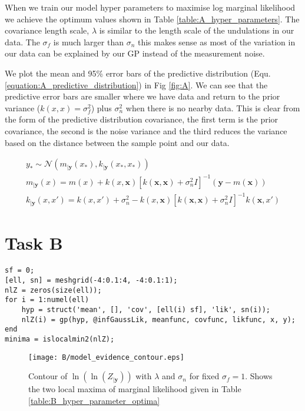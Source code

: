 \documentclass[11pt]{article}
\begin{document}
When we train our model hyper parameters to maximise log marginal likelihood we achieve the optimum values shown in Table \ref{table:A_hyper_parameters}. The covariance length scale, $\lambda$ is similar to the length scale of the undulations in our data. The $\sigma_f$ is much larger than $\sigma_n$ this makes sense as most of the variation in our data can be explained by our GP instead of the measurement noise.

We plot the mean and 95\% error bars of the predictive distribution (Equ.\ref{equation:A_predictive_distribution}) in Fig \ref{fig:A}. We can see that the predictive error bars are smaller where we have data and return to the prior variance ($k(x, x) = \sigma_f^2$) plus $\sigma_n^2$ when there is no nearby data. This is clear from the form of the predictive distribution covariance, the first term is the prior covariance, the second is the noise variance and the third reduces the variance based on the distance between the sample point and our data.

\begin{equation}
    \begin{gathered}
        y_* \sim \mathcal{N}(m_{|\textbf{y}}(x_*), k_{|\textbf{y}}(x_*, x_*)) \\
        m_{|\textbf{y}}(x) = m(x) + k(x, \textbf{x})[k(\textbf{x}, \textbf{x}) + \sigma_n^2 I]^{-1} (\textbf{y} - m(\textbf{x})) \\
        k_{|\textbf{y}}(x, x') = k(x, x') + \sigma_n^2 - k(x, \textbf{x})[k(\textbf{x}, \textbf{x}) + \sigma_n^2 I]^{-1} k(\textbf{x}, x')
    \end{gathered}
    \label{equation:A_predictive_distribution}
\end{equation}

\section{Task B}

\begin{lstlisting}[caption=Code to sweep $\lambda$ and $\sigma_n$ to identify local minima of $\log(Z_{|\textbf{y}})$, captionpos=b, basicstyle=\small]
sf = 0;
[ell, sn] = meshgrid(-4:0.1:4, -4:0.1:1);
nlZ = zeros(size(ell));
for i = 1:numel(ell)
    hyp = struct('mean', [], 'cov', [ell(i) sf], 'lik', sn(i));
    nlZ(i) = gp(hyp, @infGaussLik, meanfunc, covfunc, likfunc, x, y);
end
minima = islocalmin2(nlZ);
\end{lstlisting}
\label{lst:B}

\begin{figure}[h]
    \centering
    \texttt{[image: B/model\_evidence\_contour.eps]}
    \caption{Contour of $\ln(\ln(Z_{|\textbf{y}}))$ with $\lambda$ and $\sigma_n$ for fixed $\sigma_f = 1$. Shows the two local maxima of marginal likelihood given in Table \ref{table:B_hyper_parameter_optima}}
    \label{fig:B_marginal_liklihood_contour}
\end{figure}
\end{document}
